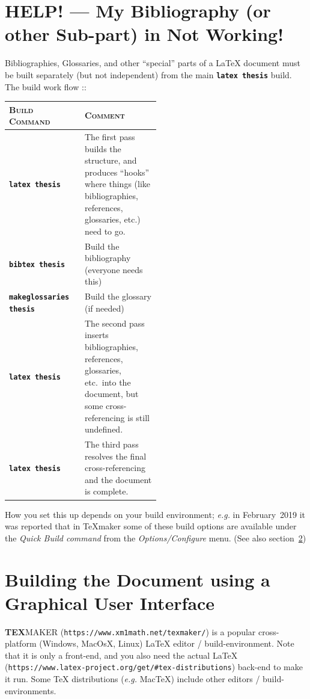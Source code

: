 \section{HELP! --- My Bibliography (or other Sub-part) in Not Working!}

Bibliographies, Glossaries, and other ``special'' parts of a \LaTeX{}
document must be built separately (but not independent) from the main
\texttt{\textbf{latex thesis}} build.  The build work flow ::\\

\begin{tabular}{lp{0.5\linewidth}}
  \hline
  \textsc{Build Command}
  &
    \textsc{Comment}
  \\
  \hline
  \texttt{\textbf{latex thesis}}
  &
    The first pass builds the structure, and produces ``hooks'' where
    things (like bibliographies, references, glossaries, etc.) need to
    go.
  \\
  \texttt{\textbf{bibtex thesis}}
  &
    Build the bibliography (everyone needs this)
  \\
  \texttt{\textbf{makeglossaries thesis}}
  &
    Build the glossary (if needed)
  \\
  \texttt{\textbf{latex thesis}}
  &
    The second pass inserts bibliographies, references, glossaries,
    etc.\ into the document, but some cross-referencing is still
    undefined.
  \\
  \texttt{\textbf{latex thesis}}
  &
    The third pass resolves the final cross-referencing and the
    document is complete.
  \\
  \hline
\end{tabular}

\vspace{\baselineskip}

How you set this up depends on your build environment; \emph{e.g.} in
February~2019 it was reported that in \TeX{}maker some of these build
options are available under the \emph{Quick Build command} from the
\emph{Options/Configure} menu. (See also section~\ref{sec:GUI})


\section{Building the Document using a Graphical User Interface}
\label{sec:GUI}

\textbf{TEX}MAKER (\texttt{https://www.xm1math.net/texmaker/}) is a
popular cross-platform (Windows, MacOsX, Linux) \LaTeX{} editor /
build-environment.  Note that it is only a front-end, and you also
need the actual \LaTeX{}
(\texttt{https://www.latex-project.org/get/\#tex-distributions})
back-end to make it run.  Some \TeX{} distributions (\emph{e.g.}\/
MacTeX) include other editors / build-environments.

